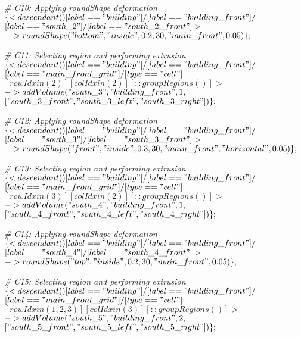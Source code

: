 \noindent \textit{\# C10: Applying roundShape deformation}\\
$\{< descendant() [label=="building"] / [label=="building\_front"] / $\\
$[label=="south\_2"] / [label=="south\_2\_front"] > $\\
$-> roundShape("bottom", "inside", 0.2, 30, "main\_front", 0.05)\};$

\noindent \textit{\# C11: Selecting region and performing extrusion}\\
$\{< descendant() [label=="building"] / [label=="building\_front"] / $\\
$[label=="main\_front\_grid"] / [type=="cell"] $\\
$[rowIdx in (2)] [colIdx in (2)] [::groupRegions()] > $\\
$-> addVolume("south\_3", "building\_front", 1, $\\
$["south\_3\_front", "south\_3\_left", "south\_3\_right"])\};$

\noindent \textit{\# C12: Applying roundShape deformation}\\
$\{< descendant() [label=="building"] / [label=="building\_front"] / $\\
$[label=="south\_3"] / [label=="south\_3\_front"] > $\\
$-> roundShape("front", "inside", 0.3, 30, "main\_front", "horizontal", 0.05)\};$

\noindent \textit{\# C13: Selecting region and performing extrusion}\\
$\{< descendant() [label=="building"] / [label=="building\_front"] / $\\
$[label=="main\_front\_grid"] / [type=="cell"] $\\
$[rowIdx in (3)] [colIdx in (2)] [::groupRegions()] > $\\
$-> addVolume("south\_4", "building\_front", 1, $\\
$["south\_4\_front", "south\_4\_left", "south\_4\_right"])\};$

\noindent \textit{\# C14: Applying roundShape deformation}\\
$\{< descendant() [label=="building"] / [label=="building\_front"] / $\\
$[label=="south\_4"] / [label=="south\_4\_front"] > $\\
$-> roundShape("top", "inside", 0.2, 30, "main\_front", 0.05)\};$

\noindent \textit{\# C15: Selecting region and performing extrusion}\\
$\{< descendant() [label=="building"] / [label=="building\_front"] / $\\
$[label=="main\_front\_grid"] / [type=="cell"] $\\
$[rowIdx in (1, 2, 3)] [colIdx in (3)] [::groupRegions()] > $\\
$-> addVolume("south\_5", "building\_front", 2, $\\
$["south\_5\_front", "south\_5\_left", "south\_5\_right"])\};$

